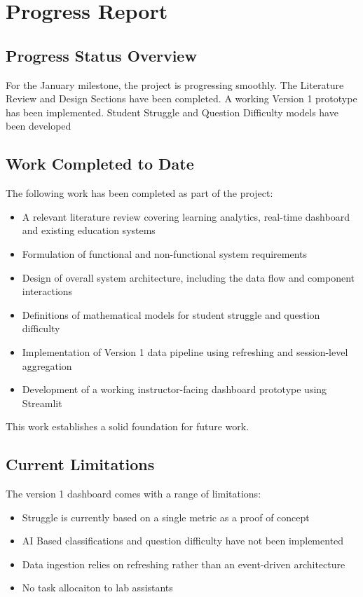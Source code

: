 \section{Progress Report}

\subsection{Progress Status Overview}
For the January milestone, the project is progressing smoothly.
The Literature Review and Design Sections have been completed.
A working Version 1 prototype has been implemented. 
Student Struggle and Question Difficulty models have been developed
\subsection{Work Completed to Date}
The following work has been completed as part of the project:
\begin{itemize}
    \item A relevant literature review covering learning analytics, real-time dashboard and existing education systems
    \item Formulation of functional and non-functional system requirements
    \item Design of overall system architecture, including the data flow and component interactions
    \item Definitions of mathematical models for student struggle and question difficulty
    \item Implementation of Version 1 data pipeline using refreshing and session-level aggregation
    \item Development of a working instructor-facing dashboard prototype using Streamlit    
\end{itemize}
This work establishes a solid foundation for future work.

\subsection{Current Limitations}
The version 1 dashboard comes with a range of limitations:
\begin{itemize}
    \item Struggle is currently based on a single metric as a proof of concept
    \item AI Based classifications and question difficulty have not been implemented
    \item Data ingestion relies on refreshing rather than an event-driven architecture
    \item No task allocaiton to lab assistants
\end{itemize}

